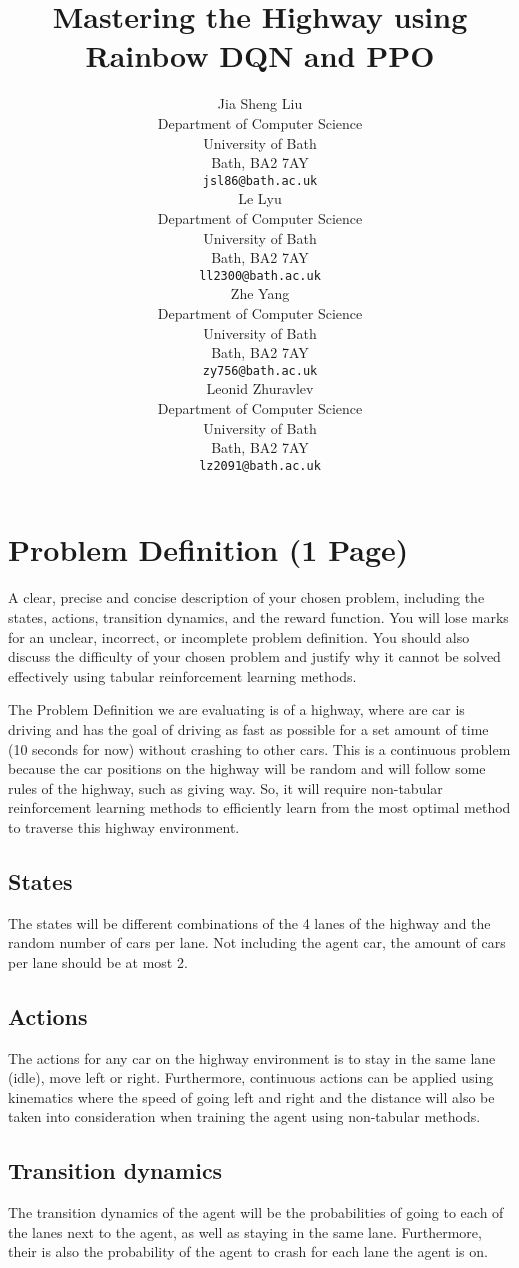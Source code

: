 \documentclass{article}
\title{Mastering the Highway using Rainbow DQN and PPO}
\author{
  Jia Sheng Liu \\
  Department of Computer Science \\
  University of Bath \\
  Bath, BA2 7AY \\
  \texttt{jsl86@bath.ac.uk} \\
  \And
  Le Lyu \\
  Department of Computer Science \\
  University of Bath \\
  Bath, BA2 7AY \\
  \texttt{ll2300@bath.ac.uk} \\
  \And
  Zhe Yang \\
  Department of Computer Science \\
  University of Bath \\
  Bath, BA2 7AY \\
  \texttt{zy756@bath.ac.uk} \\
  \And
  Leonid Zhuravlev \\
  Department of Computer Science \\
  University of Bath \\
  Bath, BA2 7AY \\
  \texttt{lz2091@bath.ac.uk} \\
}
\begin{document}
\maketitle


\section{Problem Definition (1 Page)}
A clear, precise and concise description of your chosen problem, including the states, actions, transition dynamics, and the reward function. You will lose marks for an unclear, incorrect, or incomplete problem definition. You should also discuss
the difficulty of your chosen problem and justify why it cannot be solved effectively using tabular reinforcement learning methods.


The Problem Definition we are evaluating is of a highway, where are car is driving and has the goal of driving as fast as possible for a set amount of time (10 seconds for now) without crashing to other cars. This is a continuous problem because the car positions on the highway will be random and will follow some rules of the highway, such as giving way. So, it will require non-tabular reinforcement learning methods to efficiently learn from the most optimal method to traverse this highway environment.

\subsection{States}
The states will be different combinations of the 4 lanes of the highway and the random number of cars per lane. Not including the agent car, the amount of cars per lane should be at most 2.

\subsection{Actions}
The actions for any car on the highway environment is to stay in the same lane (idle), move left or right. Furthermore, continuous actions can be applied using kinematics where the speed of going left and right and the distance will also be taken into consideration when training the agent using non-tabular methods.

\subsection{Transition dynamics}
The transition dynamics of the agent will be the probabilities of going to each of the lanes next to the agent, as well as staying in the same lane. Furthermore, their is also the probability of the agent to crash for each lane the agent is on.
\end{document}
